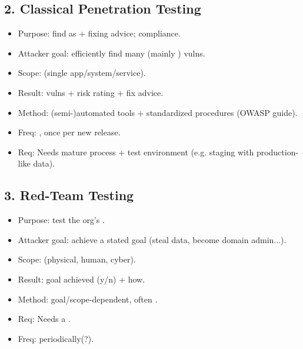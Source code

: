 \subsection{2. Classical Penetration Testing}
\begin{itemize}
\item Purpose: find as  + fixing advice; compliance.
\item Attacker goal: efficiently find many (mainly ) vulns. 
\item Scope:  (single app/system/service).
\item Result:  vulns + risk rating + fix advice. 
\item Method: (semi-)automated tools + standardized procedures (OWASP guide).
\item Freq: , once per new release.
\item Req: Needs mature  process + test environment (e.g. staging with production-like data).
\end{itemize}

\subsection{3. Red-Team Testing}
\begin{itemize}
\item Purpose: test the org's .
\item Attacker goal: achieve a stated goal  (steal data, become domain admin...). 
\item Scope:  (physical, human, cyber).
\item Result: goal achieved (y/n) + how. 
\item Method: goal/scope-dependent, often .
\item Req: Needs a . 
\item Freq: periodically(?).
\end{itemize}


